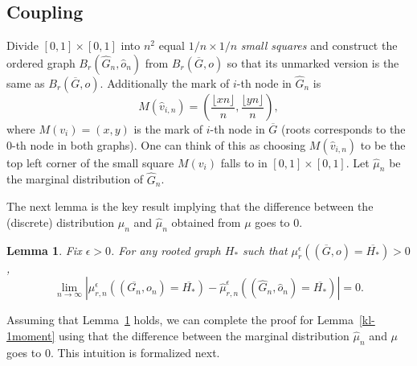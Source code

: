 \documentclass[10pt]{amsart}
\newtheorem{lemma}[theorem]{Lemma}
\begin{document}
\subsection*{Coupling} \label{coupling-def} Divide $[0, 1] \times [0, 1]$ into $n^2$ equal $1/n \times 1/n$ \textit{small squares} and  construct the ordered graph $B_r(\hat{G}_n,\hat{o}_n)$ from $B_r(\overline{G}, o)$ so that its unmarked version is the same as $B_r(\overline{G}, o)$. Additionally the mark of $i$-th node in $\hat{G}_n$ is 
\begin{equation*}
    M(\hat{v}_{i, n}) = \left(\frac{\lfloor xn \rfloor}{n}, \frac{\lfloor yn \rfloor}{n}\right),
\end{equation*}
where $M(v_{i}) = (x, y)$ is the mark of $i$-th node in $\overline{G}$ (roots corresponds to the $0$-th node in both graphs). One can think of this as choosing $M(\hat{v}_{i, n}) $ to be the top left corner of the small square $M(v_{i})
$ falls to in $[0, 1] \times [0, 1]$. Let $\hat{\mu}_n$ be the marginal distribution of $\hat{G}_n$. 

The next lemma is the key result implying that the difference between the (discrete) distribution $\mu_n$  and $\hat{\mu}_n$ obtained from $\mu$ goes to $0$. 

\begin{lemma} \label{coupling} Fix $\epsilon > 0$. For any rooted graph $H_*$ such that $\mu_r^\epsilon((\overline{G},o) = \overline{H_*}) > 0$, 
\begin{equation*}
    \lim_{n\to\infty} \left| \mu_{r, n}^\epsilon((\overline{G_n},o_n) = \overline{H_*}) -\hat{\mu}_{r,n}^\epsilon((\hat{G}_n,\hat{o}_n) = \overline{H_*}) \right| = 0.
\end{equation*}
\end{lemma}

Assuming that Lemma~\ref{coupling} holds, we can complete the proof for Lemma~\ref {kl-1moment} using that the difference between the marginal distribution $\hat{\mu}_n$ and $\mu$ goes to $0$. This intuition is formalized next.
 
\end{document}
